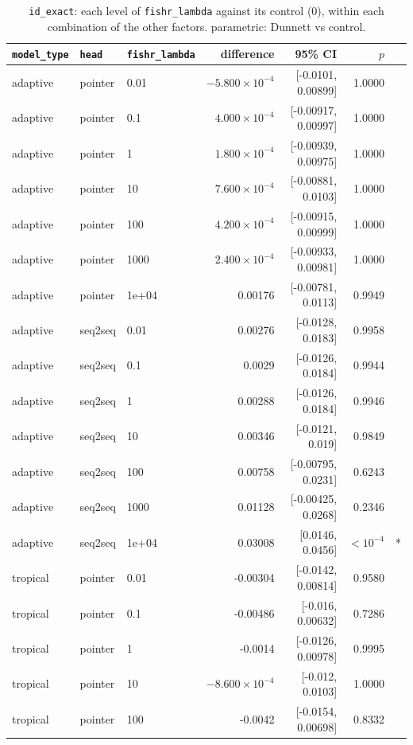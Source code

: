 \documentclass[10pt]{article}
\begin{document}
{\small
\begin{longtable}{lllrrrl}
\caption{\texttt{id\_exact}: each level of \texttt{fishr\_lambda} against its control (0), within each combination of the other factors. parametric: Dunnett vs control.}\label{tab:control-id_exact}\\
\toprule
\texttt{model\_type} & \texttt{head} & \texttt{fishr\_lambda} & difference & 95\% CI & $p$ & \\
\midrule
\endhead
adaptive & pointer & 0.01 & $-5.800\times10^{-4}$ & [-0.0101, 0.00899] & 1.0000 & \\
adaptive & pointer & 0.1 & $4.000\times10^{-4}$ & [-0.00917, 0.00997] & 1.0000 & \\
adaptive & pointer & 1 & $1.800\times10^{-4}$ & [-0.00939, 0.00975] & 1.0000 & \\
adaptive & pointer & 10 & $7.600\times10^{-4}$ & [-0.00881, 0.0103] & 1.0000 & \\
adaptive & pointer & 100 & $4.200\times10^{-4}$ & [-0.00915, 0.00999] & 1.0000 & \\
adaptive & pointer & 1000 & $2.400\times10^{-4}$ & [-0.00933, 0.00981] & 1.0000 & \\
adaptive & pointer & 1e+04 & 0.00176 & [-0.00781, 0.0113] & 0.9949 & \\
adaptive & seq2seq & 0.01 & 0.00276 & [-0.0128, 0.0183] & 0.9958 & \\
adaptive & seq2seq & 0.1 & 0.0029 & [-0.0126, 0.0184] & 0.9944 & \\
adaptive & seq2seq & 1 & 0.00288 & [-0.0126, 0.0184] & 0.9946 & \\
adaptive & seq2seq & 10 & 0.00346 & [-0.0121, 0.019] & 0.9849 & \\
adaptive & seq2seq & 100 & 0.00758 & [-0.00795, 0.0231] & 0.6243 & \\
adaptive & seq2seq & 1000 & 0.01128 & [-0.00425, 0.0268] & 0.2346 & \\
adaptive & seq2seq & 1e+04 & 0.03008 & [0.0146, 0.0456] & $<10^{-4}$ & *\\
tropical & pointer & 0.01 & -0.00304 & [-0.0142, 0.00814] & 0.9580 & \\
tropical & pointer & 0.1 & -0.00486 & [-0.016, 0.00632] & 0.7286 & \\
tropical & pointer & 1 & -0.0014 & [-0.0126, 0.00978] & 0.9995 & \\
tropical & pointer & 10 & $-8.600\times10^{-4}$ & [-0.012, 0.0103] & 1.0000 & \\
tropical & pointer & 100 & -0.0042 & [-0.0154, 0.00698] & 0.8332 & \\

\end{longtable}}
\end{document}
